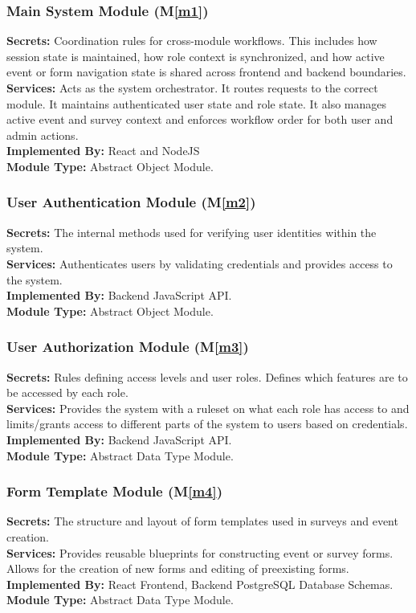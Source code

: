 \documentclass[12pt, titlepage]{article}
\newcommand{\mref}[1]{M\ref{#1}}
\begin{document}
\subsubsection{Main System Module (\mref{m1})}
\textbf{Secrets:} Coordination rules for cross-module workflows. This includes how session state is maintained, how role context is synchronized, and how active event or form navigation state is shared across frontend and backend boundaries.\\
\textbf{Services:} Acts as the system orchestrator. It routes requests to the correct module. It maintains authenticated user state and role state. It also manages active event and survey context and enforces workflow order for both user and admin actions.\\
\textbf{Implemented By:} React and NodeJS\\
\textbf{Module Type:} Abstract Object Module.

\subsubsection{User Authentication Module (\mref{m2})}
\textbf{Secrets:} The internal methods used for verifying user identities within the system.\\
\textbf{Services:} Authenticates users by validating credentials and provides access to the system.\\
\textbf{Implemented By:} Backend JavaScript API.\\
\textbf{Module Type:} Abstract Object Module.

\subsubsection{User Authorization Module (\mref{m3})}
\textbf{Secrets:} Rules defining access levels and user roles. Defines which features are to be accessed by each role.\\
\textbf{Services:} Provides the system with a ruleset on what each role has access to and limits/grants access to different parts of the system to users based on credentials. \\
\textbf{Implemented By:} Backend JavaScript API.\\
\textbf{Module Type:} Abstract Data Type Module.

\subsubsection{Form Template Module (\mref{m4})}
\textbf{Secrets:} The structure and layout of form templates used in surveys and event creation.\\
\textbf{Services:} Provides reusable blueprints for constructing event or survey forms. Allows for the creation of new forms and editing of preexisting forms.\\
\textbf{Implemented By:} React Frontend, Backend PostgreSQL Database Schemas.\\
\textbf{Module Type:} Abstract Data Type Module.
\end{document}
